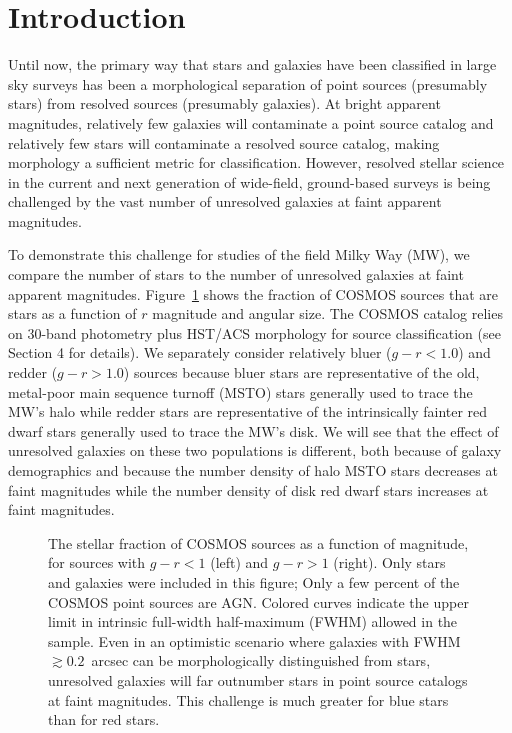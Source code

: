 \documentclass[12pt,preprint]{aastex}
\begin{document}
%
%
\section{Introduction}

Until now, the primary way that stars and galaxies have been
classified in large sky surveys has been a morphological separation
\citep[e.g.,][]{kron80,yee91,vasconcellos11a,henrion11a} of point
sources (presumably stars) from resolved sources (presumably
galaxies).  At bright apparent magnitudes, relatively few galaxies
will contaminate a point source catalog and relatively few stars will
contaminate a resolved source catalog, making morphology a sufficient
metric for classification.  However, resolved stellar science in the
current and next generation of wide-field, ground-based surveys is
being challenged by the vast number of unresolved galaxies at faint
apparent magnitudes.  

To demonstrate this challenge for studies of the field Milky Way (MW),
we compare the number of stars to the number of unresolved galaxies at
faint apparent magnitudes.  Figure~\ref{fig:stellarfraction} shows the
fraction of COSMOS sources that are stars as a function of $r$
magnitude and angular size.  The COSMOS catalog \citep[($l,b$) $\sim$ (237,43)
degrees][]{capak07a,scoville07b,ilbert09} relies on 30-band photometry
plus HST/ACS morphology for source classification (see Section 4 for
details).  We separately consider relatively bluer ($g-r < 1.0$) and redder ($g-r
> 1.0$) sources because bluer stars are representative of the old,
metal-poor main sequence turnoff (MSTO) stars generally used to trace
the MW's halo while redder stars are representative of the
intrinsically fainter red dwarf stars generally used to trace the MW's
disk.  We will see that the effect of unresolved galaxies on these two
populations is different, both because of galaxy demographics and
because the number density of halo MSTO stars decreases at faint
magnitudes while the number density of disk red dwarf stars increases at
faint magnitudes.
\begin{figure}
\centering
\caption{The stellar fraction of COSMOS sources as a function of
  magnitude, for sources with $g-r<1$ (left) and $g-r>1$ (right).
  Only stars and galaxies were included in this figure; Only a few
  percent of the COSMOS point sources are AGN.  Colored curves
  indicate the upper limit in intrinsic full-width half-maximum
  (FWHM) allowed in the sample.  Even in an optimistic scenario where
  galaxies with FWHM $\gtrsim 0.2$~arcsec can be morphologically distinguished
  from stars, unresolved galaxies will far outnumber stars in point
  source catalogs at faint magnitudes.  This challenge is much greater
  for blue stars than for red stars.}
\label{fig:stellarfraction}
\end{figure}
 
\end{document}
